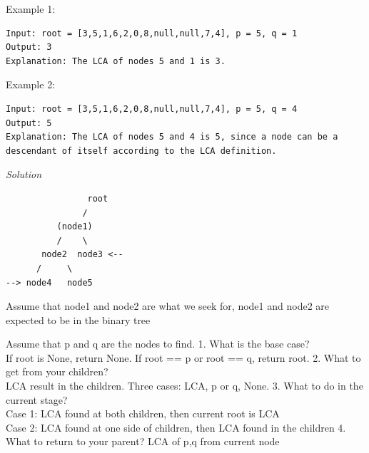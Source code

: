 \documentclass[11pt]{article}
\begin{document}
Example 1:

\begin{verbatim}
Input: root = [3,5,1,6,2,0,8,null,null,7,4], p = 5, q = 1
Output: 3
Explanation: The LCA of nodes 5 and 1 is 3.
\end{verbatim}

Example 2:

\begin{verbatim}
Input: root = [3,5,1,6,2,0,8,null,null,7,4], p = 5, q = 4
Output: 5
Explanation: The LCA of nodes 5 and 4 is 5, since a node can be a descendant of itself according to the LCA definition.
\end{verbatim}

\emph{Solution}

\begin{verbatim}
                root
               /    
          (node1)   
          /    \
       node2  node3 <--
      /     \
--> node4   node5    
\end{verbatim}

Assume that node1 and node2 are what we seek for, node1 and node2 are
expected to be in the binary tree

Assume that p and q are the nodes to find. 1. What is the base case?\\
If root is None, return None. If root == p or root == q, return root. 2.
What to get from your children?\\
LCA result in the children. Three cases: LCA, p or q, None. 3. What to
do in the current stage?\\
Case 1: LCA found at both children, then current root is LCA\\
Case 2: LCA found at one side of children, then LCA found in the
children 4. What to return to your parent? LCA of p,q from current node
\end{document}
